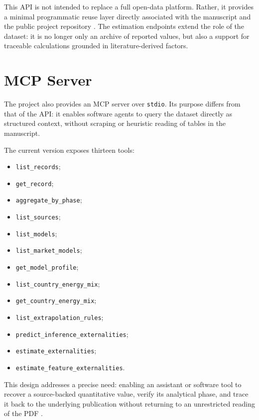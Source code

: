 \documentclass[11pt,a4paper]{article}
\begin{document}
This API is not intended to replace a full open-data platform. Rather, it provides a minimal programmatic reuse layer directly associated with the manuscript and the public project repository \cite{impactllmrepo2026}. The estimation endpoints extend the role of the dataset: it is no longer only an archive of reported values, but also a support for traceable calculations grounded in literature-derived factors.

\section{MCP Server}
The project also provides an MCP server over \texttt{stdio}. Its purpose differs from that of the API: it enables software agents to query the dataset directly as structured context, without scraping or heuristic reading of tables in the manuscript.

The current version exposes thirteen tools:
\begin{itemize}
\item \texttt{list\_records};
\item \texttt{get\_record};
\item \texttt{aggregate\_by\_phase};
\item \texttt{list\_sources};
\item \texttt{list\_models};
\item \texttt{list\_market\_models};
\item \texttt{get\_model\_profile};
\item \texttt{list\_country\_energy\_mix};
\item \texttt{get\_country\_energy\_mix};
\item \texttt{list\_extrapolation\_rules};
\item \texttt{predict\_inference\_externalities};
\item \texttt{estimate\_externalities};
\item \texttt{estimate\_feature\_externalities}.
\end{itemize}

This design addresses a precise need: enabling an assistant or software tool to recover a source-backed quantitative value, verify its analytical phase, and trace it back to the underlying publication without returning to an unrestricted reading of the PDF \cite{impactllmrepo2026}.
\end{document}
